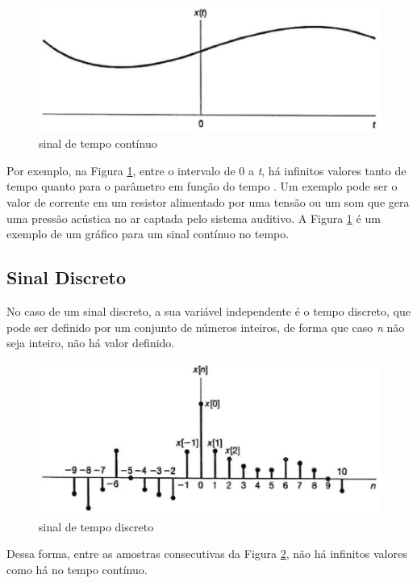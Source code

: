 \begin{figure}[h]
	\centering
	\includegraphics[scale=0.5]{figuras/fig01.eps}
	\caption{sinal de tempo contínuo \cite{oppenheim2010sinais}}
	\label{fig01}
\end{figure}

Por exemplo, na Figura \ref{fig01}, entre o intervalo de 0 a \textit{t}, há infinitos valores tanto de tempo quanto para o parâmetro em função do tempo \cite{oppenheim2010sinais}. Um exemplo pode ser o valor de corrente em um resistor alimentado por uma tensão ou um som que gera uma pressão acústica no ar captada pelo sistema auditivo. A Figura \ref{fig01} é um exemplo de um gráfico para um sinal contínuo no tempo. 


\subsection{Sinal Discreto}
No caso de um sinal discreto, a sua variável independente é o tempo discreto, que pode ser definido por um conjunto de números inteiros, de forma que caso \textit{n} não seja inteiro, não há valor definido. 

\begin{figure}[h]
	\centering
    \includegraphics[scale=0.5]{figuras/fig02.eps}
	\caption{sinal de tempo discreto \cite{oppenheim2010sinais}}
	\label{fig02}
\end{figure}

Dessa forma, entre as amostras consecutivas da Figura \ref{fig02}, não há infinitos valores como há no tempo contínuo.

